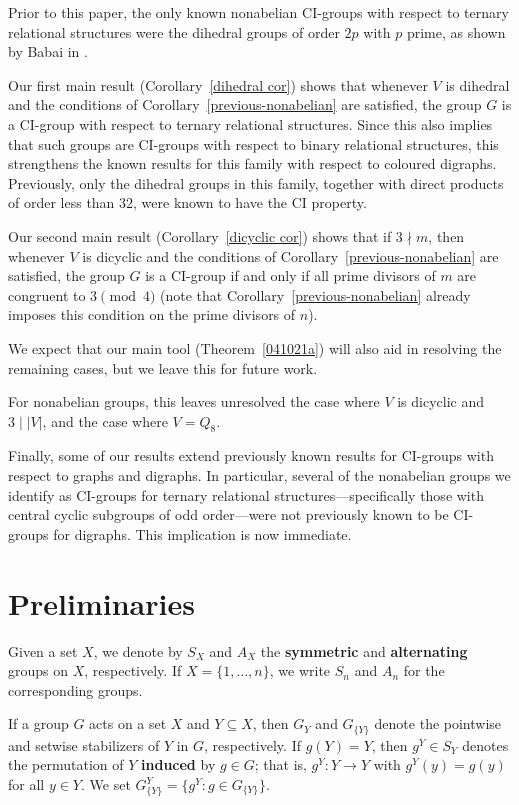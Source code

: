 \documentclass[11pt]{amsart}
\numberwithin{equation}{section}
\theoremstyle{definition}
\newcounter{case}
\begin{document}
	Prior to this paper, the only known nonabelian CI-groups with respect to ternary relational structures were the dihedral groups of order $2p$ with $p$ prime, as shown by Babai in \cite{Babai1977}.
	
	Our first main result (Corollary~\ref{dihedral cor}) shows that whenever $V$ is dihedral and the conditions of Corollary~\ref{previous-nonabelian} are satisfied, the group $G$ is a CI-group with respect to ternary relational structures. Since this also implies that such groups are CI-groups with respect to binary relational structures, this strengthens the known results for this family with respect to coloured digraphs. Previously, only the dihedral groups in this family, together with direct products of order less than $32$, were known to have the CI property.
	
	Our second main result (Corollary~\ref{dicyclic cor}) shows that if $3\nmid m$, then whenever $V$ is dicyclic and the conditions of Corollary~\ref{previous-nonabelian} are satisfied, the group $G$ is a CI-group if and only if all prime divisors of $m$ are congruent to $3\pmod 4$ (note that Corollary~\ref{previous-nonabelian} already imposes this condition on the prime divisors of $n$).
	
	We expect that our main tool (Theorem~\ref{041021a}) will also aid in resolving the remaining cases, but we leave this for future work.
	
	For nonabelian groups, this leaves unresolved the case where $V$ is dicyclic and $3\mid |V|$, and the case where $V=Q_8$.
	
	Finally, some of our results extend previously known results for CI-groups with respect to graphs and digraphs. In particular, several of the nonabelian groups we identify as CI-groups for ternary relational structures—specifically those with central cyclic subgroups of odd order—were not previously known to be CI-groups for digraphs. This implication is now immediate.
	\section{Preliminaries}\label{sec:preliminaries}
	Given a set $X$, we denote by $S_X$ and $A_X$ the \textbf{symmetric} and \textbf{alternating} groups on $X$, respectively. If $X = \{1, \ldots, n\}$, we write $S_n$ and $A_n$ for the corresponding groups.
	
	If a group $G$ acts on a set $X$ and $Y \subseteq X$, then $G_Y$ and $G_{\{Y\}}$ denote the pointwise and setwise stabilizers of $Y$ in $G$, respectively. If $g(Y) = Y$, then $g^Y \in S_Y$ denotes the permutation of $Y$ \textbf{induced} by $g \in G$; that is, $g^Y \colon Y \to Y$ with $g^Y(y) = g(y)$ for all $y \in Y$. We set $G_{\{Y\}}^Y = \{g^Y : g \in G_{\{Y\}}\}$.
	
\end{document}
